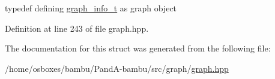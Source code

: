 typedef defining \hyperlink{structgraph__info__t}{graph\+\_\+info\+\_\+t} as graph object 



Definition at line 243 of file graph.\+hpp.



The documentation for this struct was generated from the following file\+:\begin{DoxyCompactItemize}
\item 
/home/osboxes/bambu/\+Pand\+A-\/bambu/src/graph/\hyperlink{graph_8hpp}{graph.\+hpp}\end{DoxyCompactItemize}
